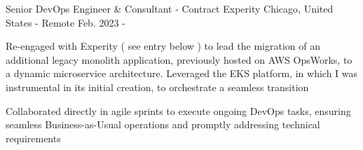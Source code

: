 
\begin{cventries}

  \cventry
    {Senior DevOps Engineer \& Consultant - Contract} %
    {Experity} %
    {Chicago, United States - Remote} %
    {Feb. 2023 - } %
    {
      \begin{cvitems} %
        \item {Re-engaged with Experity ( see entry below ) to lead the migration of an additional legacy monolith application, previously hosted on AWS OpsWorks, to a dynamic microservice architecture. Leveraged the EKS platform, in which I was instrumental in its initial creation, to orchestrate a seamless transition}
        \item {Collaborated directly in agile sprints to execute ongoing DevOps tasks, ensuring seamless Business-as-Usual operations and promptly addressing technical requirements}
      \end{cvitems}
    }


\end{cventries}
